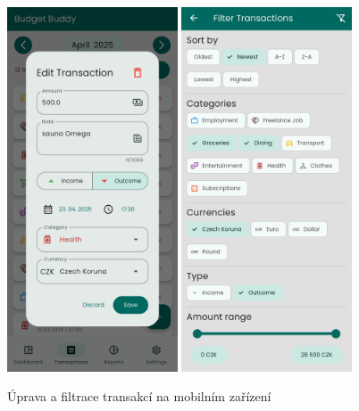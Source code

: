\documentclass[
  biblatex,
  figures=true,
  tables=false,
  glossaries,
  index
]{kidiplom}
\begin{document}
\begin{figure}
  \centering
  \includegraphics[width=0.45\textwidth]{images/edit-transaction-mobile.png}
  \hspace{0.5em}
  \includegraphics[width=0.45\textwidth]{images/filters-mobile.png}
  \caption{Úprava a filtrace transakcí na mobilním zařízení}
  \label{fig:transactions-edit}
\end{figure}
\end{document}
